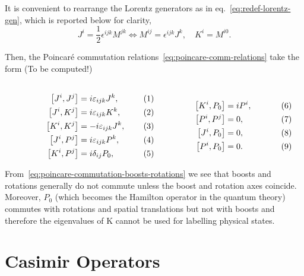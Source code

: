 It is convenient to rearrange the Lorentz generators as in eq.~\eqref{eq:redef-lorentz-gen}, which is reported below for clarity,
\begin{equation}
    J^i = \frac{1}{2} \epsilon^{ijk} M^{jk} \iff M^{ij} = \epsilon^{ijk} J^k, \quad K^i = M^{i0} .
\end{equation}

Then, the Poincaré commutation relations~\eqref{eq:poincare-comm-relations} take the form (\color{red}To be computed!\color{black})

\begin{subequations}
\label{eq:poincare-commutation-boosts-rotations}
\noindent\centering
    \begin{minipage}{0.48\textwidth}
        \begin{align}
        \comm{J^i}{J^j} &= i \epsilon_{ijk} J^k, \\
        \comm{J^i}{K^j} &= i \epsilon_{ijk} K^k ,\\
        \comm{K^i}{K^j} &= -i \epsilon_{ijk} J^k, \\
        \comm{J^i}{P^j} &= i \epsilon_{ijk} P^k ,\\
        \comm{K^i}{P^j} &= i \delta_{ij} P_0,
        \end{align}
    \end{minipage}
    \hfill
    \begin{minipage}{0.48\textwidth}
    \label{eq:bell_states}
        \begin{align}
        \comm{K^i}{P_0} &= i P^i ,\\
        \comm{P^i}{P^j} &= 0, \\
        \comm{J^i}{P_0} &= 0, \\
        \comm{P^i}{P_0} &= 0 .
        \end{align}
    \end{minipage}\bigskip
    \end{subequations}

From~\eqref{eq:poincare-commutation-boosts-rotations} we see that boosts and rotations generally do not commute unless the boost and rotation axes coincide. Moreover, $P_0$ (which becomes the Hamilton operator in the quantum theory) commutes with rotations and spatial translations but not with boosts and therefore the eigenvalues of K cannot be used for labelling physical states.


\section{Casimir Operators}


